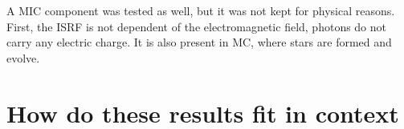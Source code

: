 A MIC component was tested as well, but it was not kept for physical reasons. First, the ISRF is not dependent of the electromagnetic field, photons do not carry any electric charge. It is also present in MC, where stars are formed and evolve.


\section{How do these results fit in context}
%		



